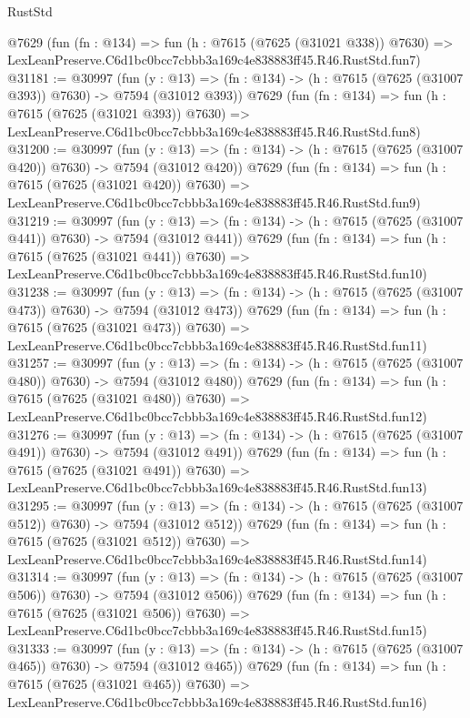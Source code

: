 \begin{lexlean}{RustStd}
\begin{coremodule}
    @7629
    (fun (fn : @134) =>
    fun (h : @7615 (@7625 (@31021 @338)) @7630) =>
    LexLeanPreserve.C6d1bc0bcc7cbbb3a169c4e838883ff45.R46.RustStd.fun7)
@31181 := @30997
    (fun (y : @13) => (fn : @134) -> (h : @7615 (@7625 (@31007 @393)) @7630) -> @7594 (@31012 @393))
    @7629
    (fun (fn : @134) =>
    fun (h : @7615 (@7625 (@31021 @393)) @7630) =>
    LexLeanPreserve.C6d1bc0bcc7cbbb3a169c4e838883ff45.R46.RustStd.fun8)
@31200 := @30997
    (fun (y : @13) => (fn : @134) -> (h : @7615 (@7625 (@31007 @420)) @7630) -> @7594 (@31012 @420))
    @7629
    (fun (fn : @134) =>
    fun (h : @7615 (@7625 (@31021 @420)) @7630) =>
    LexLeanPreserve.C6d1bc0bcc7cbbb3a169c4e838883ff45.R46.RustStd.fun9)
@31219 := @30997
    (fun (y : @13) => (fn : @134) -> (h : @7615 (@7625 (@31007 @441)) @7630) -> @7594 (@31012 @441))
    @7629
    (fun (fn : @134) =>
    fun (h : @7615 (@7625 (@31021 @441)) @7630) =>
    LexLeanPreserve.C6d1bc0bcc7cbbb3a169c4e838883ff45.R46.RustStd.fun10)
@31238 := @30997
    (fun (y : @13) => (fn : @134) -> (h : @7615 (@7625 (@31007 @473)) @7630) -> @7594 (@31012 @473))
    @7629
    (fun (fn : @134) =>
    fun (h : @7615 (@7625 (@31021 @473)) @7630) =>
    LexLeanPreserve.C6d1bc0bcc7cbbb3a169c4e838883ff45.R46.RustStd.fun11)
@31257 := @30997
    (fun (y : @13) => (fn : @134) -> (h : @7615 (@7625 (@31007 @480)) @7630) -> @7594 (@31012 @480))
    @7629
    (fun (fn : @134) =>
    fun (h : @7615 (@7625 (@31021 @480)) @7630) =>
    LexLeanPreserve.C6d1bc0bcc7cbbb3a169c4e838883ff45.R46.RustStd.fun12)
@31276 := @30997
    (fun (y : @13) => (fn : @134) -> (h : @7615 (@7625 (@31007 @491)) @7630) -> @7594 (@31012 @491))
    @7629
    (fun (fn : @134) =>
    fun (h : @7615 (@7625 (@31021 @491)) @7630) =>
    LexLeanPreserve.C6d1bc0bcc7cbbb3a169c4e838883ff45.R46.RustStd.fun13)
@31295 := @30997
    (fun (y : @13) => (fn : @134) -> (h : @7615 (@7625 (@31007 @512)) @7630) -> @7594 (@31012 @512))
    @7629
    (fun (fn : @134) =>
    fun (h : @7615 (@7625 (@31021 @512)) @7630) =>
    LexLeanPreserve.C6d1bc0bcc7cbbb3a169c4e838883ff45.R46.RustStd.fun14)
@31314 := @30997
    (fun (y : @13) => (fn : @134) -> (h : @7615 (@7625 (@31007 @506)) @7630) -> @7594 (@31012 @506))
    @7629
    (fun (fn : @134) =>
    fun (h : @7615 (@7625 (@31021 @506)) @7630) =>
    LexLeanPreserve.C6d1bc0bcc7cbbb3a169c4e838883ff45.R46.RustStd.fun15)
@31333 := @30997
    (fun (y : @13) => (fn : @134) -> (h : @7615 (@7625 (@31007 @465)) @7630) -> @7594 (@31012 @465))
    @7629
    (fun (fn : @134) =>
    fun (h : @7615 (@7625 (@31021 @465)) @7630) =>
    LexLeanPreserve.C6d1bc0bcc7cbbb3a169c4e838883ff45.R46.RustStd.fun16)

\end{coremodule}
\end{lexlean}
